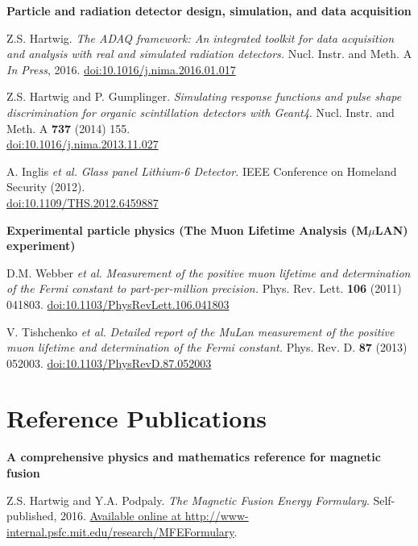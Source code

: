 \documentclass[10pt]{article}
\begin{document}
\textbf{Particle and radiation detector design, simulation, and data acquisition}
\begin{innerlist}
\item Z.S. Hartwig. \textit{The ADAQ framework: An integrated toolkit
  for data acquisition and analysis with real and simulated radiation
  detectors.} Nucl. Instr. and Meth. A \textit{In Press}, 2016.
  \href{http://dx.doi.org/10.1016/j.nima.2016.01.017}{doi:10.1016/j.nima.2016.01.017}\vspace{0.2cm}
  
\item Z.S. Hartwig and P. Gumplinger. \textit{Simulating response functions
  and pulse shape discrimination for organic scintillation detectors
  with Geant4}. Nucl. Instr. and Meth. A \textbf{737} (2014) 155.\\
  \href{http://dx.doi.org/10.1016/j.nima.2013.11.027}{doi:10.1016/j.nima.2013.11.027}
  \vspace{0.2cm}

\item A. Inglis \textit{et al.} \textit{Glass panel Lithium-6 Detector.}
IEEE Conference on Homeland Security (2012).\\
\href{http://dx.doi.org/10.1109/THS.2012.6459887}{doi:10.1109/THS.2012.6459887}
\end{innerlist}

\vspace{0.5cm}

\textbf{Experimental particle physics (The Muon Lifetime Analysis (M$\mu$LAN) experiment)}
\begin{innerlist}
\item  D.M. Webber \textit{et al.} \textit{Measurement of the positive muon
  lifetime and determination of the Fermi constant to
  part-per-million precision.} Phys. Rev. Lett. \textbf{106} (2011)
  041803.
  \href{http://dx.doi.org/10.1103/PhysRevLett.106.041803}{doi:10.1103/PhysRevLett.106.041803}\vspace{0.2cm}

\item V. Tishchenko \textit{et al.} \textit{Detailed report of the
  MuLan measurement of the positive muon lifetime and determination of
  the Fermi constant.} Phys. Rev. D. \textbf{87} (2013)
    052003. 
    \href{http://dx.doi.org/10.1103/PhysRevD.87.052003}{doi:10.1103/PhysRevD.87.052003}
\end{innerlist}

\section{Reference Publications}
\textbf{A comprehensive physics and mathematics reference for magnetic fusion}
\begin{innerlist}
\item Z.S. Hartwig and Y.A. Podpaly. \textit{The Magnetic Fusion
  Energy Formulary}. Self-published, 2016.
  \href{http://www-internal.psfc.mit.edu/research/MFEFormulary}{Available
    online at http://www-internal.psfc.mit.edu/research/MFEFormulary}.
\end{innerlist}
\end{document}
